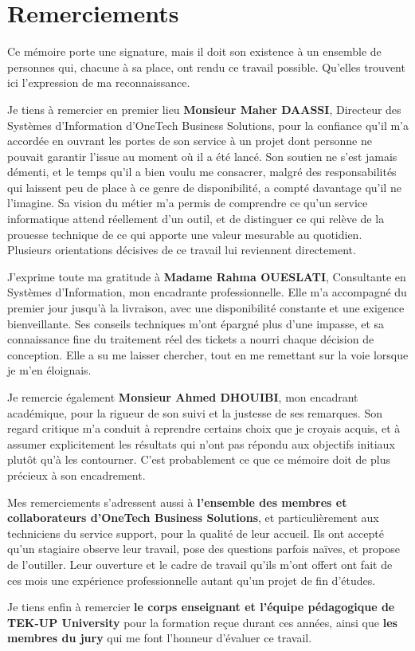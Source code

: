 \chapter*{\huge Remerciements}
\vspace{6mm}

Ce mémoire porte une signature, mais il doit son existence à un ensemble de personnes qui, chacune
à sa place, ont rendu ce travail possible. Qu'elles trouvent ici l'expression de ma reconnaissance.

Je tiens à remercier en premier lieu \textbf{Monsieur Maher DAASSI}, Directeur des Systèmes
d'Information d'OneTech Business Solutions, pour la confiance qu'il m'a accordée en ouvrant les
portes de son service à un projet dont personne ne pouvait garantir l'issue au moment où il a été
lancé. Son soutien ne s'est jamais démenti, et le temps qu'il a bien voulu me consacrer, malgré des
responsabilités qui laissent peu de place à ce genre de disponibilité, a compté davantage qu'il ne
l'imagine. Sa vision du métier m'a permis de comprendre ce qu'un service informatique attend
réellement d'un outil, et de distinguer ce qui relève de la prouesse technique de ce qui apporte
une valeur mesurable au quotidien. Plusieurs orientations décisives de ce travail lui reviennent
directement.

J'exprime toute ma gratitude à \textbf{Madame Rahma OUESLATI}, Consultante en Systèmes
d'Information, mon encadrante professionnelle. Elle m'a accompagné du premier jour jusqu'à la
livraison, avec une disponibilité constante et une exigence bienveillante. Ses conseils techniques
m'ont épargné plus d'une impasse, et sa connaissance fine du traitement réel des tickets a nourri
chaque décision de conception. Elle a su me laisser chercher, tout en me remettant sur la voie
lorsque je m'en éloignais.

Je remercie également \textbf{Monsieur Ahmed DHOUIBI}, mon encadrant académique, pour la rigueur
de son suivi et la justesse de ses remarques. Son regard critique m'a conduit à reprendre certains
choix que je croyais acquis, et à assumer explicitement les résultats qui n'ont pas répondu aux
objectifs initiaux plutôt qu'à les contourner. C'est probablement ce que ce mémoire doit de plus
précieux à son encadrement.

Mes remerciements s'adressent aussi à \textbf{l'ensemble des membres et collaborateurs d'OneTech
Business Solutions}, et particulièrement aux techniciens du service support, pour la qualité de
leur accueil. Ils ont accepté qu'un stagiaire observe leur travail, pose des questions parfois
naïves, et propose de l'outiller. Leur ouverture et le cadre de travail qu'ils m'ont offert ont
fait de ces mois une expérience professionnelle autant qu'un projet de fin d'études.

Je tiens enfin à remercier \textbf{le corps enseignant et l'équipe pédagogique de TEK-UP
University} pour la formation reçue durant ces années, ainsi que \textbf{les membres du jury} qui
me font l'honneur d'évaluer ce travail.
